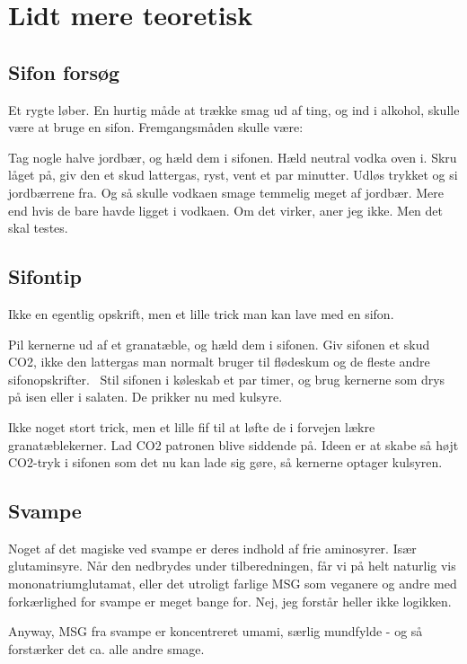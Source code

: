 \documentclass[
]{book}
\begin{document}
\chapter{Lidt mere teoretisk}\label{lidt-mere-teoretisk}

\section{Sifon forsøg}\label{sifon-forsuxf8g}

Et rygte løber. En hurtig måde at trække smag ud af ting, og ind i alkohol, skulle være at bruge en sifon. Fremgangsmåden skulle være:

Tag nogle halve jordbær, og hæld dem i sifonen. Hæld neutral vodka oven i. Skru låget på, giv den et skud lattergas, ryst, vent et par minutter. Udløs trykket og si jordbærrene fra. Og så skulle vodkaen smage temmelig meget af jordbær. Mere end hvis de bare havde ligget i vodkaen. Om det virker, aner jeg ikke. Men det skal testes.

\section{Sifontip}\label{sifontip}

Ikke en egentlig opskrift, men et lille trick man kan lave med en sifon.

Pil kernerne ud af et granatæble, og hæld dem i sifonen. Giv sifonen et skud CO2, ikke den lattergas man normalt bruger til flødeskum og de fleste andre sifonopskrifter.~
Stil sifonen i køleskab et par timer, og brug kernerne som drys på isen eller i salaten. De prikker nu med kulsyre.

Ikke noget stort trick, men et lille fif til at løfte de i forvejen lækre granatæblekerner. Lad CO2 patronen blive siddende på. Ideen er at skabe så højt CO2-tryk i sifonen som det nu kan lade sig gøre, så kernerne optager kulsyren.

\section{Svampe}\label{svampe}

Noget af det magiske ved svampe er deres indhold af frie aminosyrer. Især
glutaminsyre. Når den nedbrydes under tilberedningen, får vi på helt naturlig
vis mononatriumglutamat, eller det utroligt farlige MSG som veganere og andre
med forkærlighed for svampe er meget bange for. Nej, jeg forstår heller ikke
logikken.

Anyway, MSG fra svampe er koncentreret umami, særlig mundfylde - og så forstærker
det ca. alle andre smage.
\end{document}
